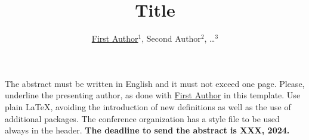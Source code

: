 \documentclass[11pt, a4paper, oneside]{article}%
\begin{document}
\title{Title}

\author{\underline{First Author}$^1$, Second Author$^2$, \ldots$^3$}

\address{$^1$first.author@email.com, Department of Biostatistics, University of XYZ\\ $^2$second.author@email.com, Department of Classification, Research Center ABC \\$^3$Affiliation\ldots}

\Title %

The abstract must be written in English and it must not exceed one page. Please, underline the presenting author, as done with \underline{First Author} in this template. Use plain \LaTeX, avoiding the introduction of new definitions as well as the use of additional packages. The conference organization has a style file to be used always in the header. \textbf{The deadline to send the abstract is XXX, 2024.}
	


\end{document}
